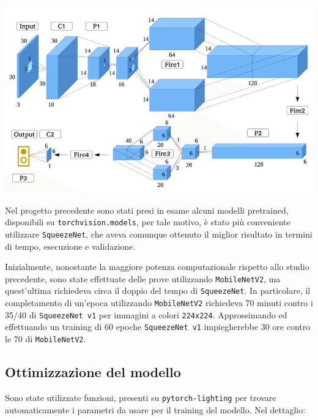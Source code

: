 \documentclass[11pt]{article}
\begin{document}
\begin{center}
    \begin{minipage}{0.48\linewidth}
    \includegraphics[width=\linewidth]{03.png}
    \end{minipage}
\end{center}

Nel progetto precedente
sono stati presi in esame alcuni modelli pretrained, disponibili su
\texttt{torchvision.models}, per tale motivo,
è stato più conveniente utilizzare \texttt{SqueezeNet}, che aveva comunque ottenuto il miglior risultato
in termini di tempo, esecuzione e validazione.

Inizialmente, nonostante la maggiore potenza computazionale rispetto allo studio precedente,
sono state effettuate delle prove utilizzando \texttt{MobileNetV2}, ma quest'ultima richiedeva
circa il doppio del tempo di \texttt{SqueezeNet}. In particolare, il completamento di un'epoca utilizzando \texttt{MobileNetV2} richiedeva 70 minuti
contro i 35/40 di \texttt{SqueezeNet v1} per immagini a colori \texttt{224x224}. Approssimando ed effettuando un training di 60 epoche \texttt{SqueezeNet v1} impiegherebbe 30 ore contro le 70 di \texttt{MobileNetV2}.

\subsection{Ottimizzazione del modello}

Sono state utilizzate funzioni, presenti su \texttt{pytorch-lighting} per trovare automaticamente i parametri da usare per il training del modello.
Nel dettaglio:
\end{document}

